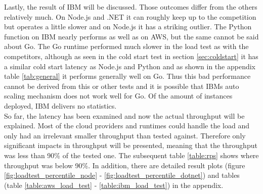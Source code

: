Lastly, the result of \gls{IBM} will be discussed. Those outcomes differ from the others relatively much. On Node.js and .NET it can roughly keep up to the competition but operates a little slower and on Node.js it has a striking outlier. The Python function on IBM nearly performs as well as on \gls{AWS}, but the same cannot be said about Go. The Go runtime performed much slower in the load test as with the competitors, although as seen in the cold start test in section \ref{sec:coldstart} it has a similar cold start latency as Node.js and Python and as shown in the appendix table \ref{tab:general} it performs generally well on Go. Thus this bad performance cannot be derived from this or other tests and it is possible that IBMs auto scaling mechanism does not work well for Go. Of the amount of instances deployed, IBM delivers no statistics.\\
So far, the latency has been examined and now the actual throughput will be explained. Most of the cloud providers and runtimes could handle the load and only had an irrelevant smaller throughput than tested against. Therefore only significant impacts in throughput will be presented, meaning that the throughput was less than 90\% of the tested one. The subsequent table \ref{table:rps} shows where throughput was below 90\%.
In addition, there are detailed result plots (figure \ref{fig:loadtest_percentile_node} - \ref{fig:loadtest_percentile_dotnet}) and tables (table \ref{table:aws_load_test} - \ref{table:ibm_load_test}) in the appendix.
